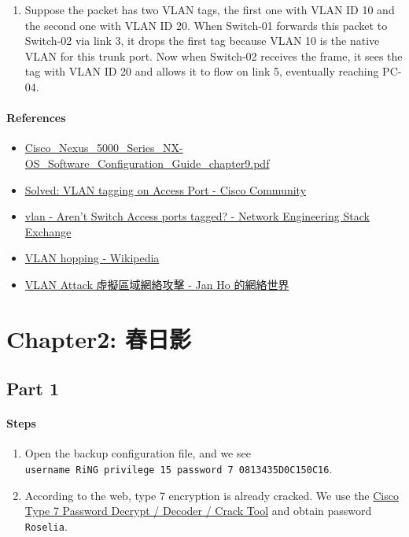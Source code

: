 \documentclass[12pt, a4paper]{article}
\begin{document}
\begin{enumerate}
     \item Suppose the packet has two VLAN tags, the first one with VLAN ID 10
     and the second one with VLAN ID 20. When Switch-01 forwards this packet to
     Switch-02 via link 3, it drops the first tag because VLAN 10 is the
     native VLAN for this trunk port. Now when Switch-02 receives the frame, it
     sees the tag with VLAN ID 20 and allows it to flow on link 5, eventually
     reaching PC-04.
  \end{enumerate}

  \paragraph{References}
  \begin{itemize}
    \item \href{https://www.cisco.com/en/US/docs/switches/datacenter/nexus5000/sw/configuration/nxos/Cisco_Nexus_5000_Series_NX-OS_Software_Configuration_Guide_chapter9.pdf}{Cisco\_Nexus\_5000\_Series\_NX-OS\_Software\_Configuration\_Guide\_chapter9.pdf}
    \item \href{https://community.cisco.com/t5/switching/vlan-tagging-on-access-port/td-p/4056567}{Solved: VLAN tagging on Access Port - Cisco Community}
    \item \href{https://networkengineering.stackexchange.com/questions/40483/arent-switch-access-ports-tagged}{vlan - Aren't Switch Access ports tagged? - Network Engineering Stack Exchange}
    \item \href{https://en.wikipedia.org/wiki/VLAN_hopping}{VLAN hopping - Wikipedia}
    \item \href{https://www.jannet.hk/virtual-lan-vlan-attack-zh-hant/}{VLAN Attack 虛擬區域網絡攻擊 - Jan Ho 的網絡世界}
  \end{itemize}
  \section*{Chapter2: 春日影}
  \subsection*{Part 1}
  \paragraph{Steps}
  \begin{enumerate}
    \item Open the backup configuration file, and we see\\
    \verb|username RiNG privilege 15 password 7 0813435D0C150C16|.
    \item According to the web, type 7 encryption is already cracked. We use the
    \href{https://www.firewall.cx/cisco/cisco-routers/cisco-type7-password-crack.html}{Cisco Type 7 Password Decrypt / Decoder / Crack Tool}
    and obtain password \verb|Roselia|.
  \end{enumerate}
\end{document}
